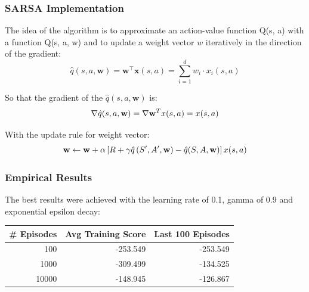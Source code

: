 \documentclass{beamer}
\begin{document}
\begin{frame}
\frametitle{SARSA Implementation}
The idea of the
algorithm is to approximate an action-value function Q(s, a) 
with a function Q(s, a, w) and to update a weight vector $w$
iteratively in the direction of the gradient:
\begin{equation}
\hat{q}(s, a, \mathbf{w}) = \mathbf{w}^{\top} \mathbf{x}(s, a)=\sum_{i=1}^{d} w_{i} \cdot x_{i}(s, a) 
\end{equation}

So that the gradient of the $\hat{q}(s, a, \mathbf{w})$ is:
\begin{equation}
\nabla \hat q(s,a,{\bf{w}}) = \nabla {\bf{w}}_{}^Tx(s,a) = x(s,a)
\end{equation}

With the update rule for weight vector:
\begin{equation}
{\bf{w}} \leftarrow {\bf{w}} + \alpha \left[ {R + \gamma \hat q\left( {{S^\prime },{A^\prime },{\bf{w}}} \right) - \hat q(S,A,{\bf{w}})} \right]x(s,a)
\end{equation}
\end{frame}



\begin{frame}
\frametitle{Empirical Results}
The best results were 
achieved with the learning rate of 0.1, gamma of 0.9 and 
exponential epsilon decay: 

\begin{table}[H]
	\centering
	\begin{tabular}{|r|r|r|}
		\hline
		\multicolumn{1}{|l|}{\# Episodes} & \multicolumn{1}{l|}{Avg Training Score} & \multicolumn{1}{l|}{Last 100 Episodes} \\
		\hline
		100   & -253.549 & -253.549 \\
		\hline
		1000  & -309.499 & -134.525 \\
		\hline
		10000 & -148.945 & -126.867 \\
		\hline
	\end{tabular}%
\end{table}%
\end{frame}
\end{document}
